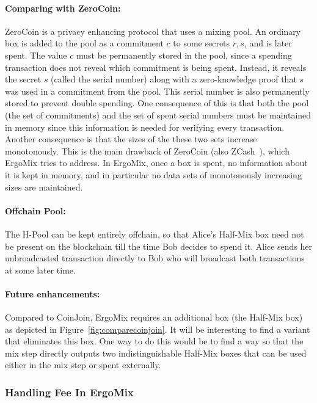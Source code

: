 \documentclass[11pt]{article}
\newcommand{\mixname}{ErgoMix\xspace}
\begin{document}
\paragraph{Comparing with ZeroCoin:} ZeroCoin is a privacy enhancing protocol that uses a mixing pool. An ordinary box is added to the pool as a commitment $c$ to some secrets $r, s$, and is later spent. The value $c$ must be permanently stored in the pool, since a spending transaction does not reveal which commitment is being spent. Instead, it reveals the secret $s$ (called the serial number) along with a zero-knowledge proof that $s$ was used in a commitment from the pool. This serial number is also permanently stored to prevent double spending. One consequence of this is that both the pool (the set of commitments) and the set of spent serial numbers must be maintained in memory since this information is needed for verifying every transaction. Another consequence is that the sizes of the these two sets increase monotonously.
This is the main drawback of ZeroCoin (also ZCash~\cite{zcash}), which \mixname tries to address. 
In \mixname, once a box is spent, no information about it is kept in memory, and in particular no data sets of monotonously increasing sizes are maintained. 


\paragraph{Offchain Pool:} The H-Pool can be kept entirely offchain, so that Alice's Half-Mix box need not be present on the blockchain till the time Bob decides to spend it. Alice sends her unbroadcasted transaction directly to Bob who will broadcast both transactions at some later time. 

\paragraph{Future enhancements:} Compared to CoinJoin, \mixname requires an additional box (the Half-Mix box) as depicted in Figure~\ref{fig:comparecoinjoin}. It will be interesting to find a variant that eliminates this box. 
One way to do this would be to find a way so that the mix step directly outputs two indistinguishable Half-Mix boxes that can be used either in the mix step or spent externally. 
\subsubsection{Handling Fee In \mixname}
\end{document}
